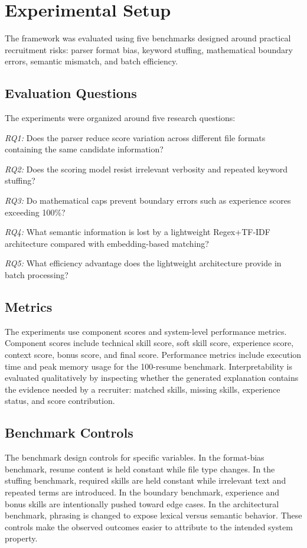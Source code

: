 \documentclass[conference]{IEEEtran}
\begin{document}
\section{Experimental Setup}
The framework was evaluated using five benchmarks designed around practical recruitment risks: parser format bias, keyword stuffing, mathematical boundary errors, semantic mismatch, and batch efficiency.

\subsection{Evaluation Questions}
The experiments were organized around five research questions:

\textit{RQ1:} Does the parser reduce score variation across different file formats containing the same candidate information?

\textit{RQ2:} Does the scoring model resist irrelevant verbosity and repeated keyword stuffing?

\textit{RQ3:} Do mathematical caps prevent boundary errors such as experience scores exceeding 100\%?

\textit{RQ4:} What semantic information is lost by a lightweight Regex+TF-IDF architecture compared with embedding-based matching?

\textit{RQ5:} What efficiency advantage does the lightweight architecture provide in batch processing?

\subsection{Metrics}
The experiments use component scores and system-level performance metrics. Component scores include technical skill score, soft skill score, experience score, context score, bonus score, and final score. Performance metrics include execution time and peak memory usage for the 100-resume benchmark. Interpretability is evaluated qualitatively by inspecting whether the generated explanation contains the evidence needed by a recruiter: matched skills, missing skills, experience status, and score contribution.

\subsection{Benchmark Controls}
The benchmark design controls for specific variables. In the format-bias benchmark, resume content is held constant while file type changes. In the stuffing benchmark, required skills are held constant while irrelevant text and repeated terms are introduced. In the boundary benchmark, experience and bonus skills are intentionally pushed toward edge cases. In the architectural benchmark, phrasing is changed to expose lexical versus semantic behavior. These controls make the observed outcomes easier to attribute to the intended system property.
\end{document}
